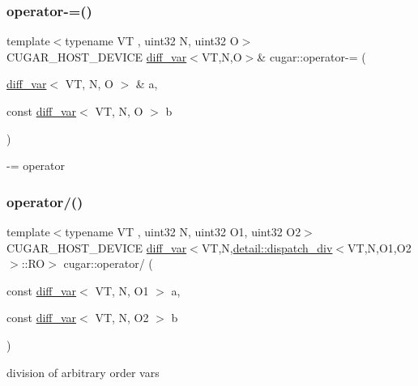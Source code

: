 \subsubsection{\texorpdfstring{operator-\/=()}{operator-=()}}
{\footnotesize\ttfamily template$<$typename VT , uint32 N, uint32 O$>$ \\
C\+U\+G\+A\+R\+\_\+\+H\+O\+S\+T\+\_\+\+D\+E\+V\+I\+CE \hyperlink{structcugar_1_1diff__var}{diff\+\_\+var}$<$VT,N,O$>$\& cugar\+::operator-\/= (\begin{DoxyParamCaption}\item[{\hyperlink{structcugar_1_1diff__var}{diff\+\_\+var}$<$ VT, N, O $>$ \&}]{a,  }\item[{const \hyperlink{structcugar_1_1diff__var}{diff\+\_\+var}$<$ VT, N, O $>$}]{b }\end{DoxyParamCaption})\hspace{0.3cm}{\ttfamily [inline]}}

-\/= operator \mbox{\label{group___auto_diff_module_gad49a1e7cc916cd560facf38a498e0ea4}} 
\subsubsection{\texorpdfstring{operator/()}{operator/()}\hspace{0.1cm}{\footnotesize\ttfamily [1/3]}}
{\footnotesize\ttfamily template$<$typename VT , uint32 N, uint32 O1, uint32 O2$>$ \\
C\+U\+G\+A\+R\+\_\+\+H\+O\+S\+T\+\_\+\+D\+E\+V\+I\+CE \hyperlink{structcugar_1_1diff__var}{diff\+\_\+var}$<$VT,N,\hyperlink{structcugar_1_1detail_1_1dispatch__div}{detail\+::dispatch\+\_\+div}$<$VT,N,O1,O2$>$\+::RO$>$ cugar\+::operator/ (\begin{DoxyParamCaption}\item[{const \hyperlink{structcugar_1_1diff__var}{diff\+\_\+var}$<$ VT, N, O1 $>$}]{a,  }\item[{const \hyperlink{structcugar_1_1diff__var}{diff\+\_\+var}$<$ VT, N, O2 $>$}]{b }\end{DoxyParamCaption})\hspace{0.3cm}{\ttfamily [inline]}}

division of arbitrary order vars \mbox{\label{group___auto_diff_module_ga10ddb4877915c2ef70eb0555afa89169}} 
